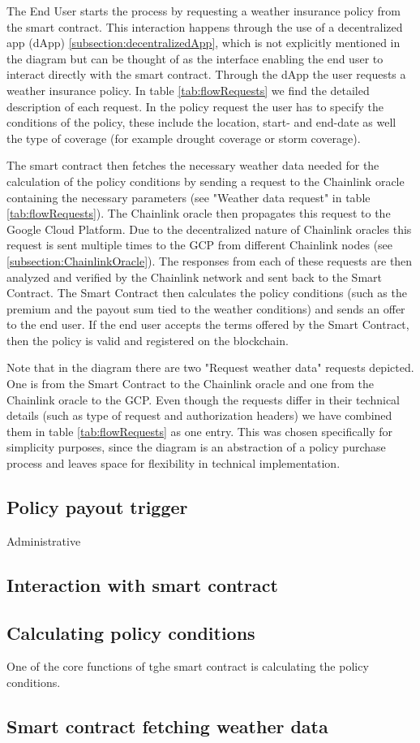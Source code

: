 The End User starts the process by requesting a weather insurance policy from the smart contract. This interaction happens through the use of a decentralized app (dApp) \cref{subsection:decentralizedApp}, which is not explicitly mentioned in the diagram but can be thought of as the interface enabling the end user to interact directly with the smart contract. Through the dApp the user requests a weather insurance policy. In table \cref{tab:flowRequests} we find the detailed description of each request. In the policy request the user has to specify the conditions of the policy, these include the location, start- and end-date as well the type of coverage (for example drought coverage or storm coverage).

The smart contract then fetches the necessary weather data needed for the calculation of the policy conditions by sending a request to the Chainlink oracle containing the necessary parameters (see "Weather data request" in table \cref{tab:flowRequests}). The Chainlink oracle then propagates this request to the Google Cloud Platform. Due to the decentralized nature of Chainlink oracles this request is sent multiple times to the GCP from different Chainlink nodes (see \cref{subsection:ChainlinkOracle}). The responses from each of these requests are then analyzed and verified by the Chainlink network and sent back to the Smart Contract. The Smart Contract then calculates the policy conditions (such as the premium and the payout sum tied to the weather conditions) and sends an offer to the end user. If the end user accepts the terms offered by the Smart Contract, then the policy is valid and registered on the blockchain.

Note that in the diagram there are two "Request weather data" requests depicted. One is from the Smart Contract to the Chainlink oracle and one from the Chainlink oracle to the GCP. Even though the requests differ in their technical details (such as type of request and authorization headers) we have combined them in table \cref{tab:flowRequests} as one entry. This was chosen specifically for simplicity purposes, since the diagram is an abstraction of a policy purchase process and leaves space for flexibility in technical implementation.

\subsection{Policy payout trigger}

Administrative

\subsection{Interaction with smart contract}
\subsection{Calculating policy conditions}

One of the core functions of tghe smart contract is calculating the policy conditions.


\subsection{Smart contract fetching weather data}